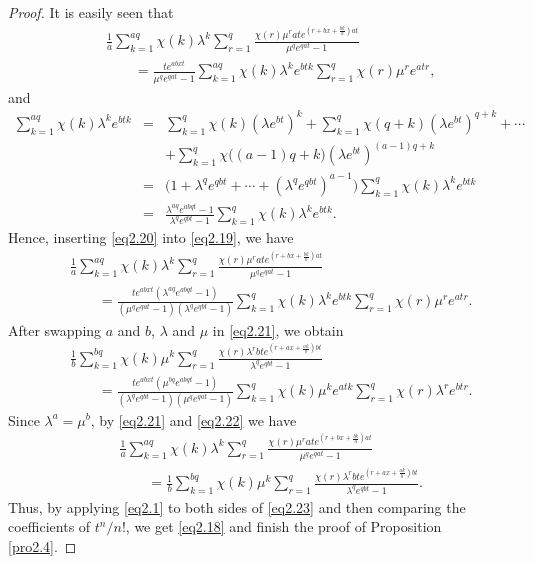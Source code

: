 \documentclass[reqno]{amsart}
\numberwithin{equation}{section}
\begin{document}
\begin{proof}
It is easily seen that
\begin{eqnarray}\label{eq2.19}
&&\frac{1}{a}\sum_{k=1}^{aq}\chi(k)\lambda^{k}\sum_{r=1}^{q}\frac{\chi(r)\mu^{r}ate^{(r+bx+\frac{bk}{a})at}}{\mu^{q}e^{qat}-1}\nonumber\\
&&\qquad=\frac{te^{abxt}}{\mu^{q}e^{qat}-1}\sum_{k=1}^{aq}\chi(k)\lambda^{k}e^{btk}\sum_{r=1}^{q}\chi(r)\mu^{r}e^{atr},
\end{eqnarray}
and
\begin{eqnarray}\label{eq2.20}
\sum_{k=1}^{aq}\chi(k)\lambda^{k}e^{btk}&=&\sum_{k=1}^{q}\chi(k)(\lambda e^{bt})^{k}+\sum_{k=1}^{q}\chi(q+k)(\lambda e^{bt})^{q+k}+\cdots\nonumber\\
&&+\sum_{k=1}^{q}\chi\bigl((a-1)q+k\bigl)(\lambda e^{bt})^{(a-1)q+k}\nonumber\\
&=&\bigl(1+\lambda^{q}e^{qbt}+\cdots+(\lambda^{q}e^{qbt})^{a-1}\bigl)\sum_{k=1}^{q}\chi(k)\lambda^{k}e^{btk}\nonumber\\
&=&\frac{\lambda^{aq}e^{abqt}-1}{\lambda^{q}e^{qbt}-1}\sum_{k=1}^{q}\chi(k)\lambda^{k}e^{btk}.
\end{eqnarray}
Hence, inserting \eqref{eq2.20} into \eqref{eq2.19}, we have
\begin{eqnarray}\label{eq2.21}
&&\frac{1}{a}\sum_{k=1}^{aq}\chi(k)\lambda^{k}\sum_{r=1}^{q}\frac{\chi(r)\mu^{r}ate^{(r+bx+\frac{bk}{a})at}}{\mu^{q}e^{qat}-1}\nonumber\\
&&\qquad=\frac{te^{abxt}(\lambda^{aq}e^{abqt}-1)}{(\mu^{q}e^{qat}-1)(\lambda^{q}e^{qbt}-1)}\sum_{k=1}^{q}\chi(k)\lambda^{k}e^{btk}\sum_{r=1}^{q}\chi(r)\mu^{r}e^{atr}.
\end{eqnarray}
After swapping $a$ and $b$, $\lambda$ and $\mu$ in \eqref{eq2.21}, we obtain
\begin{eqnarray}\label{eq2.22}
&&\frac{1}{b}\sum_{k=1}^{bq}\chi(k)\mu^{k}\sum_{r=1}^{q}\frac{\chi(r)\lambda^{r}bte^{(r+ax+\frac{ak}{b})bt}}{\lambda^{q}e^{qbt}-1}\nonumber\\
&&\qquad=\frac{te^{abxt}(\mu^{bq}e^{abqt}-1)}{(\lambda^{q}e^{qbt}-1)(\mu^{q}e^{qat}-1)}\sum_{k=1}^{q}\chi(k)\mu^{k}e^{atk}\sum_{r=1}^{q}\chi(r)\lambda^{r}e^{btr}.
\end{eqnarray}
Since $\lambda^{a}=\mu^{b}$, by \eqref{eq2.21} and \eqref{eq2.22} we have
\begin{eqnarray}\label{eq2.23}
&&\frac{1}{a}\sum_{k=1}^{aq}\chi(k)\lambda^{k}\sum_{r=1}^{q}\frac{\chi(r)\mu^{r}ate^{(r+bx+\frac{bk}{a})at}}{\mu^{q}e^{qat}-1}\nonumber\\
&&\qquad=\frac{1}{b}\sum_{k=1}^{bq}\chi(k)\mu^{k}\sum_{r=1}^{q}\frac{\chi(r)\lambda^{r}bte^{(r+ax+\frac{ak}{b})bt}}{\lambda^{q}e^{qbt}-1}.
\end{eqnarray}
Thus, by applying \eqref{eq2.1} to both sides of \eqref{eq2.23} and then comparing the coefficients of $t^{n}/n!$, we get \eqref{eq2.18} and finish the proof of Proposition \ref{pro2.4}.
\end{proof}
\end{document}
